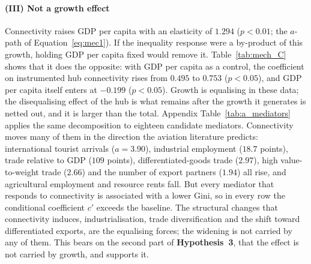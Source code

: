 

\paragraph{(III) Not a growth effect}
Connectivity raises GDP per capita with an elasticity of $1.294$ ($p<0.01$; the $a$-path of Equation~\eqref{eq:mec1}). If the inequality response were a by-product of this growth, holding GDP per capita fixed would remove it. Table~\ref{tab:mech_C} shows that it does the opposite: with GDP per capita as a control, the coefficient on instrumented hub connectivity rises from $0.495$ to $0.753$ ($p<0.05$), and GDP per capita itself enters at $-0.199$ ($p<0.05$). Growth is equalising in these data; the disequalising effect of the hub is what remains after the growth it generates is netted out, and it is larger than the total. Appendix Table~\ref{tab:a_mediators} applies the same decomposition to eighteen candidate mediators. Connectivity moves many of them in the direction the aviation literature predicts: international tourist arrivals ($a=3.90$), industrial employment ($18.7$ points), trade relative to GDP ($109$ points), differentiated-goods trade ($2.97$), high value-to-weight trade ($2.66$) and the number of export partners ($1.94$) all rise, and agricultural employment and resource rents fall. But every mediator that responds to connectivity is associated with a lower Gini, so in every row the conditional coefficient $c'$ exceeds the baseline. The structural changes that connectivity induces, industrialisation, trade diversification and the shift toward differentiated exports, are the equalising forces; the widening is not carried by any of them. This bears on the second part of \textbf{Hypothesis~3}, that the effect is not carried by growth, and supports it.



